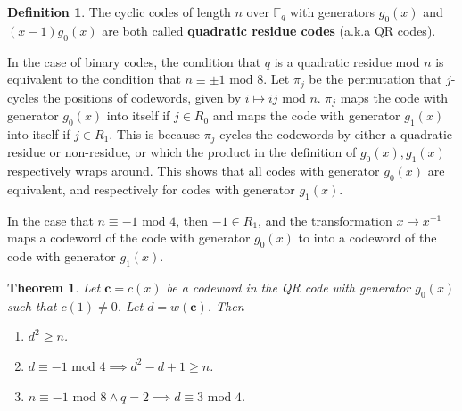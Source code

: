 \documentclass{article}
\newcommand{\F}{\mathbb{F}}
\renewcommand{\mod}{\text{ mod }}
\newcommand{\mt}{\mapsto}
\renewcommand{\=}{\equiv}
\renewcommand{\i}{^{-1}}
\renewcommand{\v}{\mathbf}
\theoremstyle{plain}
\newtheorem{thm}{Theorem}[subsection]
\theoremstyle{definition}
\newtheorem{defn}{Definition}[subsection]
\begin{document}
\begin{defn}
  \label{def:qr-code}
  The cyclic codes of length $n$ over $\F_q$ with generators $g_0(x)$ and $(x-1)g_0(x)$ are both called \textbf{quadratic residue codes} (a.k.a QR codes).
\end{defn}

In the case of binary codes, the condition that $q$ is a quadratic residue mod $n$ is equivalent to the condition that $n \= \pm 1 \mod 8$.
Let $\pi_{j}$ be the permutation that $j$-cycles the positions of codewords, given by $i \mt ij \mod n$.
$\pi_j$ maps the code with generator $g_0(x)$ into itself if $j \in R_0$ and maps the code with generator $g_1(x)$ into itself if $j \in R_1$.
This is because $\pi_j$ cycles the codewords by either a quadratic residue or non-residue, or which the product in the definition of $g_0(x), g_1(x)$ respectively wraps around.
This shows that all codes with generator $g_0(x)$ are equivalent, and respectively for codes with generator $g_1(x)$.

In the case that $n \= -1 \mod 4$, then $-1 \in R_1$, and the transformation $x \mt x\i$ maps a codeword of the code with generator $g_0(x)$ to into a codeword of the code with generator $g_1(x)$.

\begin{thm}
  Let $\v c = c(x)$ be a codeword in the QR code with generator $g_0(x)$ such that $c(1) \neq 0$.
  Let $d = w(\v c)$.
  Then
  \begin{enumerate}
    \item[(i)] $d^2 \geq n$.
    \item[(ii)] $d \= -1 \mod 4 \implies d^2 - d + 1 \geq n$.
    \item[(iii)] $n \= -1 \mod 8 \land q = 2 \implies d \= 3 \mod 4$.
  \end{enumerate}
\end{thm}
\end{document}
